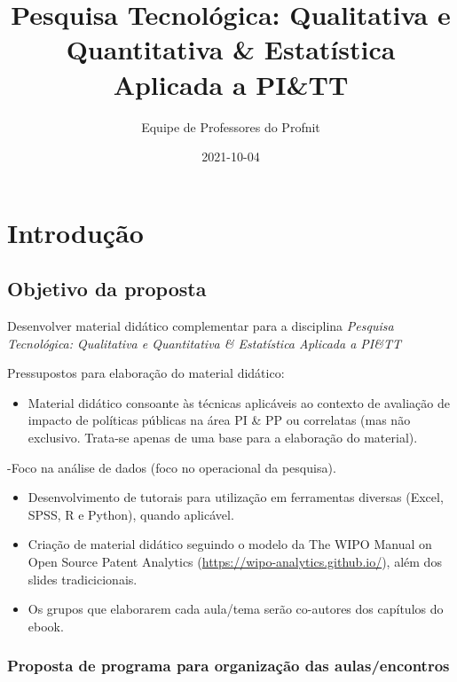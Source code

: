 \documentclass[
]{book}
\title{Pesquisa Tecnológica: Qualitativa e Quantitativa \& Estatística Aplicada a PI\&TT}
\author{Equipe de Professores do Profnit}
\date{2021-10-04}
\providecommand{\tightlist}{%
  \setlength{\itemsep}{0pt}\setlength{\parskip}{0pt}}
\begin{document}
\maketitle

{
\setcounter{tocdepth}{1}
\tableofcontents
}
\hypertarget{introduuxe7uxe3o}{%
\chapter{Introdução}\label{introduuxe7uxe3o}}

\hypertarget{objetivo-da-proposta}{%
\section{Objetivo da proposta}\label{objetivo-da-proposta}}

Desenvolver material didático complementar para a disciplina \emph{Pesquisa Tecnológica: Qualitativa e Quantitativa \& Estatística Aplicada a PI\&TT}

Pressupostos para elaboração do material didático:

\begin{itemize}
\tightlist
\item
  Material didático consoante às técnicas aplicáveis ao contexto de avaliação de impacto de políticas públicas na área PI \& PP ou correlatas (mas não exclusivo. Trata-se apenas de uma base para a elaboração do material).
\end{itemize}

-Foco na análise de dados (foco no operacional da pesquisa).

\begin{itemize}
\item
  Desenvolvimento de tutorais para utilização em ferramentas diversas (Excel, SPSS, R e Python), quando aplicável.
\item
  Criação de material didático seguindo o modelo da The WIPO Manual on Open Source Patent Analytics (\url{https://wipo-analytics.github.io/}), além dos slides tradicicionais.
\item
  Os grupos que elaborarem cada aula/tema serão co-autores dos capítulos do ebook.
\end{itemize}

\hypertarget{proposta-de-programa-para-organizauxe7uxe3o-das-aulasencontros}{%
\subsection{Proposta de programa para organização das aulas/encontros}\label{proposta-de-programa-para-organizauxe7uxe3o-das-aulasencontros}}
\end{document}
